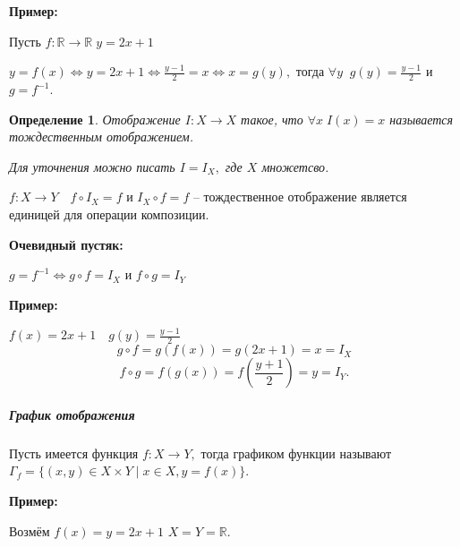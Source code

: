 \documentclass{article}
\newtheorem{Definition}{Определение}[section]
\begin{document}
\par\medskip \textbf{Пример:}\par
Пусть $f:\mathbb{R}\rightarrow\mathbb{R} \; y=2x+1$

$y=f(x) \Leftrightarrow y=2x+1 \Leftrightarrow \frac{y-1}{2}=x \Leftrightarrow x=g(y),$ тогда $\forall y\;\; g(y)=\frac{y-1}{2}$ и $g=f^{-1}.$
\begin{Definition}
Отображение $I:X\rightarrow X$ такое, что $\forall x \; I(x)=x$ называется тождественным отображением.

Для уточнения можно писать $I=I_X,$ где $X$ множетсво.
\end{Definition}

$f:X\rightarrow Y \quad f\circ I_X=f$ и $I_X\circ f=f$ -- тождественное отображение является единицей для операции композиции.

\par\medskip \textbf{Очевидный пустяк:}\par
$g=f^{-1} \Leftrightarrow g\circ f=I_X$ и $f\circ g = I_Y$ 
\par\medskip \textbf{Пример:}\par

$f(x)=2x+1 \quad g(y)=\frac{y-1}{2}$ $$g\circ f=g(f(x))=g(2x+1)=x=I_X$$ $$f\circ g=f(g(x))=f(\frac{y+1}{2})=y=I_Y.$$

\newpage
\subparagraph{График отображения}
Пусть имеется функция $f:X\rightarrow Y,$ тогда графиком функции называют $\Gamma_f=\{(x,y)\in X\times Y\mid x\in X, y=f(x)\}.$
\par\medskip \textbf{Пример:}\par
Возмём $f(x)=y=2x+1$ $X=Y=\mathbb{R}.$ 
\begin{figure}[h!]
\end{figure}
\end{document}
